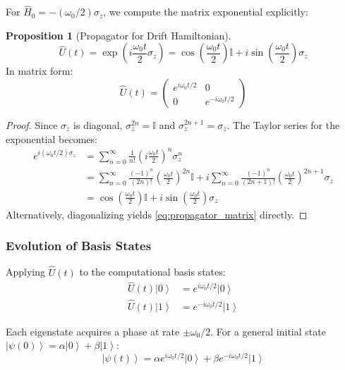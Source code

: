 \documentclass[11pt,a4paper]{article}
\theoremstyle{definition}
\newtheorem{proposition}[theorem]{Proposition}
\theoremstyle{remark}
\newcommand{\ket}[1]{\left|#1\right\rangle}
\newcommand{\identity}{\mathbb{I}}
\begin{document}
For $\hat{H}_0 = -(\omega_0/2) \sigma_z$, we compute the matrix exponential explicitly:

\begin{proposition}[Propagator for Drift Hamiltonian]
\begin{equation}
\hat{U}(t) = \exp\left(i \frac{\omega_0 t}{2} \sigma_z \right)
= \cos\left(\frac{\omega_0 t}{2}\right) \identity + i \sin\left(\frac{\omega_0 t}{2}\right) \sigma_z
\label{eq:propagator}
\end{equation}
In matrix form:
\begin{equation}
\hat{U}(t) = \begin{pmatrix}
e^{i \omega_0 t / 2} & 0 \\
0 & e^{-i \omega_0 t / 2}
\end{pmatrix}
\label{eq:propagator_matrix}
\end{equation}
\end{proposition}

\begin{proof}
Since $\sigma_z$ is diagonal, $\sigma_z^{2n} = \identity$ and $\sigma_z^{2n+1} = \sigma_z$. The Taylor series for the exponential becomes:
\begin{align}
e^{i (\omega_0 t / 2) \sigma_z}
&= \sum_{n=0}^\infty \frac{1}{n!} \left(i \frac{\omega_0 t}{2}\right)^n \sigma_z^n \\
&= \sum_{n=0}^\infty \frac{(-1)^n}{(2n)!} \left(\frac{\omega_0 t}{2}\right)^{2n} \identity
+ i \sum_{n=0}^\infty \frac{(-1)^n}{(2n+1)!} \left(\frac{\omega_0 t}{2}\right)^{2n+1} \sigma_z \\
&= \cos\left(\frac{\omega_0 t}{2}\right) \identity + i \sin\left(\frac{\omega_0 t}{2}\right) \sigma_z
\end{align}
Alternatively, diagonalizing yields \eqref{eq:propagator_matrix} directly.
\end{proof}

\subsubsection{Evolution of Basis States}

Applying $\hat{U}(t)$ to the computational basis states:
\begin{align}
\hat{U}(t) \ket{0} &= e^{i \omega_0 t / 2} \ket{0} \label{eq:evolve_0} \\
\hat{U}(t) \ket{1} &= e^{-i \omega_0 t / 2} \ket{1} \label{eq:evolve_1}
\end{align}

Each eigenstate acquires a phase at rate $\pm \omega_0 / 2$. For a general initial state $\ket{\psi(0)} = \alpha \ket{0} + \beta \ket{1}$:
\begin{equation}
\ket{\psi(t)} = \alpha e^{i \omega_0 t / 2} \ket{0} + \beta e^{-i \omega_0 t / 2} \ket{1}
\label{eq:general_evolution}
\end{equation}
\end{document}
